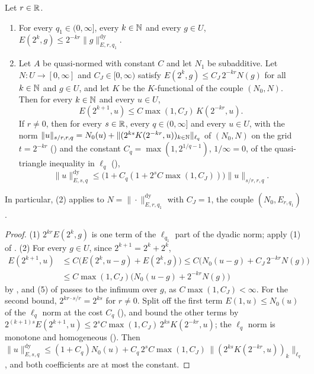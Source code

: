 \begin{lemma}
\label{lem:e-couple-jackson}
\leanok
{}
Let $r \in \mathbb{R}$.
\begin{enumerate}
  \item For every $q_1 \in (0, \infty]$, every $k \in \mathbb{N}$ and every $g \in U$,
    $E(2^k, g) \leq 2^{-kr} \|g\|^{\mathrm{dy}}_{E, r, q_1}$.
  \item Let $A$ be quasi-normed with constant $C$ and let $N_1$ be subadditive. Let
    $N : U \to [0, \infty]$ and $C_J \in [0, \infty)$ satisfy
    $E(2^k, g) \leq C_J \, 2^{-kr} N(g)$ for all $k \in \mathbb{N}$ and $g \in U$, and let $K$ be the
    $K$-functional of the couple $(N_0, N)$. Then for every $k \in \mathbb{N}$ and every $u \in U$,
    \[
      E(2^{k+1}, u) \leq C \max(1, C_J) \, K(2^{-kr}, u) .
    \]
    If $r \neq 0$, then for every $s \in \mathbb{R}$, every $q \in (0, \infty]$ and every $u \in U$,
    with the norm $\|u\|_{s/r, r, q} = N_0(u) + \|(2^{ks} K(2^{-kr}, u))_{k \in \mathbb{N}}\|_{\ell_q}$
    of $(N_0, N)$ on the grid $t = 2^{-kr}$ () and the constant
    $C_q = \max(1, 2^{1/q - 1})$, $1/\infty = 0$, of the quasi-triangle inequality in $\ell_q$
    (),
    \[
      \|u\|^{\mathrm{dy}}_{E, s, q} \leq \bigl(1 + C_q (1 + 2^s C \max(1, C_J))\bigr)
      \|u\|_{s/r, r, q} .
    \]
\end{enumerate}
In particular, (2) applies to $N = \|\cdot\|^{\mathrm{dy}}_{E, r, q_1}$ with $C_J = 1$, the
couple $(N_0, E_{r, q_1})$.
\end{lemma}

\begin{proof}
\leanok
{}
(1) $2^{kr} E(2^k, g)$ is one term of the $\ell_{q_1}$ part of the dyadic norm; apply (1) of
. (2) For every $g \in U$, since $2^{k+1} = 2^k + 2^k$,
\begin{align*}
  E(2^{k+1}, u) &\leq C \bigl(E(2^k, u - g) + E(2^k, g)\bigr)
  \leq C \bigl(N_0(u - g) + C_J \, 2^{-kr} N(g)\bigr) \\
  &\leq C \max(1, C_J) \bigl(N_0(u - g) + 2^{-kr} N(g)\bigr)
\end{align*}
by , and (5) of  passes to the infimum over
$g$, as $C \max(1, C_J) < \infty$. For the second bound, $2^{kr \cdot s/r} = 2^{ks}$ for
$r \neq 0$. Split off the first term $E(1, u) \leq N_0(u)$ of the $\ell_q$ norm at the cost $C_q$
(), and bound the other terms by
$2^{(k+1)s} E(2^{k+1}, u) \leq 2^s C \max(1, C_J) \, 2^{ks} K(2^{-kr}, u)$; the $\ell_q$ norm is
monotone and homogeneous (). Then
$\|u\|^{\mathrm{dy}}_{E, s, q} \leq (1 + C_q) N_0(u) + C_q \, 2^s C \max(1, C_J) \,
\|(2^{ks} K(2^{-kr}, u))_k\|_{\ell_q}$, and both coefficients are at most the constant.
\end{proof}

